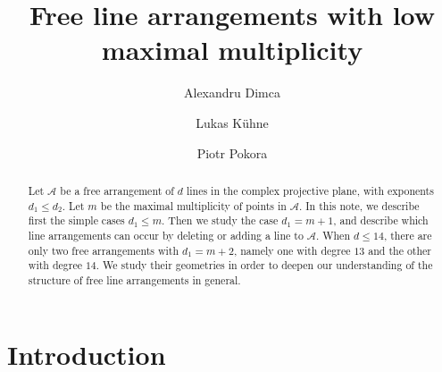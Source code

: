 \documentclass[12pt]{amsart}
\theoremstyle{plain}
\theoremstyle{definition}
\numberwithin{equation}{section}
\newcommand{\A}{{\mathcal A}}
\begin{document}

\title [On some free line arrangements]
{Free line arrangements with low maximal multiplicity}

\author[Alexandru Dimca]{Alexandru Dimca}
\address{Universit\'e C\^ ote d'Azur, CNRS, LJAD, France and Simion Stoilow Institute of Mathematics,
P.O. Box 1-764, RO-014700 Bucharest, Romania.}

\author[Lukas K\"uhne]{Lukas K\"uhne}
\address{Universit\"at Bielefeld, Fakult\"at f\"ur Mathematik, Bielefeld, Germany.}

\author[Piotr Pokora]{Piotr Pokora}
\address{Department of Mathematics,
University of the National Education Commission Krakow,
Podchor\c a\.zych 2,
PL-30-084 Krak\'ow, Poland.}







\begin{abstract} 
Let $\A$ be a free arrangement of $d$ lines in the complex projective plane, with exponents $d_1\leq d_2$. Let $m$ be the maximal multiplicity of points in $\A$. In this note, we describe first the simple cases $d_1 \leq m$. Then we study  the case $d_1=m+1$, and describe which line arrangements can occur by deleting or adding a line to $\A$.
 When $d \leq 14$, there are only two  free arrangements with $d_1=m+2$, namely one with degree $13$ and the other with degree $14$. We study their geometries in order to deepen our understanding of the structure of free line arrangements in general.

\end{abstract}
 
\maketitle

\section{Introduction} 
\end{document}
